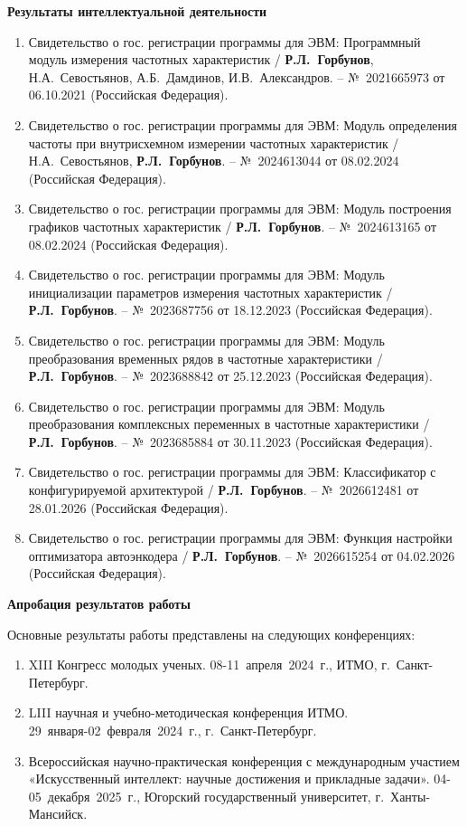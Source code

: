 \textbf{Результаты интеллектуальной деятельности}\par
\begin{enumerate}
    \item Свидетельство о гос. регистрации программы для ЭВМ: Программный модуль измерения частотных характеристик / \textbf{Р.Л.~Горбунов}, Н.А.~Севостьянов, А.Б.~Дамдинов, И.В.~Александров. -- №~2021665973 от 06.10.2021 (Российская Федерация).
    \item Свидетельство о гос. регистрации программы для ЭВМ: Модуль определения частоты при внутрисхемном измерении частотных характеристик / Н.А.~Севостьянов, \textbf{Р.Л.~Горбунов}. -- №~2024613044 от 08.02.2024 (Российская Федерация).
    \item Свидетельство о гос. регистрации программы для ЭВМ: Модуль построения графиков частотных характеристик / \textbf{Р.Л.~Горбунов}. -- №~2024613165 от 08.02.2024 (Российская Федерация).
    \item Свидетельство о гос. регистрации программы для ЭВМ: Модуль инициализации параметров измерения частотных характеристик / \textbf{Р.Л.~Горбунов}. -- №~2023687756 от 18.12.2023 (Российская Федерация).
    \item Свидетельство о гос. регистрации программы для ЭВМ: Модуль преобразования временных рядов в частотные характеристики / \textbf{Р.Л.~Горбунов}. -- №~2023688842 от 25.12.2023 (Российская Федерация).
    \item Свидетельство о гос. регистрации программы для ЭВМ: Модуль преобразования комплексных переменных в частотные характеристики / \textbf{Р.Л.~Горбунов}. -- №~2023685884 от 30.11.2023 (Российская Федерация).
    \item Свидетельство о гос. регистрации программы для ЭВМ: Классификатор с конфигурируемой архитектурой / \textbf{Р.Л.~Горбунов}. -- №~2026612481 от 28.01.2026 (Российская Федерация).
    \item Свидетельство о гос. регистрации программы для ЭВМ: Функция настройки оптимизатора автоэнкодера / \textbf{Р.Л.~Горбунов}. -- №~2026615254 от 04.02.2026 (Российская Федерация).
\end{enumerate}

\textbf{Апробация результатов работы}\par
Основные результаты работы представлены на следующих конференциях:  
\begin{enumerate}
    \item XIII Конгресс молодых ученых. 08-11~апреля~2024~г., ИТМО, г.~Санкт-Петербург.
    \item LIII научная и учебно-методическая конференция ИТМО. 29~января-02~февраля~2024~г., г.~Санкт-Петербург.
    \item Всероссийская научно-практическая конференция с международным участием «Искусственный интеллект: научные достижения и прикладные задачи». 04-05~декабря~2025~г., Югорский государственный университет, г.~Ханты-Мансийск.
\end{enumerate}

